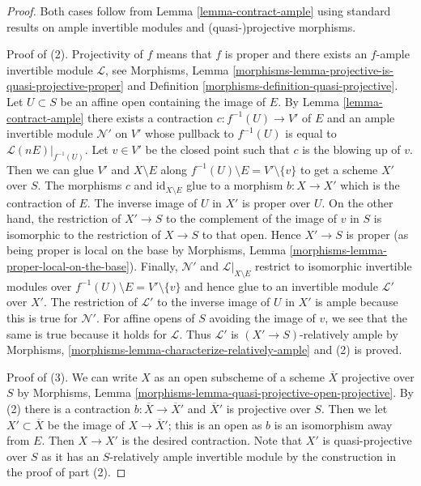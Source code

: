 \begin{proof}
Both cases follow from Lemma \ref{lemma-contract-ample}
using standard results on ample invertible modules and
(quasi-)projective morphisms.

\medskip\noindent
Proof of (2). Projectivity of $f$ means that $f$ is proper and there exists
an $f$-ample invertible module $\mathcal{L}$, see
Morphisms, Lemma \ref{morphisms-lemma-projective-is-quasi-projective-proper}
and Definition \ref{morphisms-definition-quasi-projective}.
Let $U \subset S$ be an affine open containing the image of $E$.
By Lemma \ref{lemma-contract-ample} there exists a contraction
$c : f^{-1}(U) \to V'$ of $E$ and an ample invertible module
$\mathcal{N}'$ on $V'$ whose pullback to $f^{-1}(U)$ is equal to
$\mathcal{L}(nE)|_{f^{-1}(U)}$. Let $v \in V'$ be the closed point
such that $c$ is the blowing up of $v$.
Then we can glue $V'$ and $X \setminus E$ along
$f^{-1}(U) \setminus E = V' \setminus \{v\}$
to get a scheme $X'$ over $S$. The morphisms $c$ and
$\text{id}_{X \setminus E}$ glue to a morphism $b : X \to X'$
which is the contraction of $E$. The inverse image of $U$ in $X'$
is proper over $U$. On the other hand, the restriction of $X' \to S$
to the complement of the image of $v$ in $S$ is isomorphic to the
restriction of $X \to S$ to that open. Hence $X' \to S$ is proper
(as being proper is local on the base by
Morphisms, Lemma \ref{morphisms-lemma-proper-local-on-the-base}).
Finally, $\mathcal{N}'$ and $\mathcal{L}|_{X \setminus E}$ restrict to
isomorphic invertible modules over $f^{-1}(U) \setminus E = V' \setminus \{v\}$
and hence glue to an invertible module $\mathcal{L}'$ over $X'$.
The restriction of $\mathcal{L}'$ to the inverse image of $U$
in $X'$ is ample because this is true for $\mathcal{N}'$.
For affine opens of $S$ avoiding the image of $v$, we see that
the same is true because it holds for $\mathcal{L}$.
Thus $\mathcal{L}'$ is $(X' \to S)$-relatively ample by
Morphisms, \ref{morphisms-lemma-characterize-relatively-ample}
and (2) is proved.

\medskip\noindent
Proof of (3). We can write $X$ as an open subscheme of a scheme
$\overline{X}$ projective over $S$ by Morphisms, Lemma
\ref{morphisms-lemma-quasi-projective-open-projective}.
By (2) there is a contraction $b : \overline{X} \to \overline{X}'$
and $\overline{X}'$ is projective over $S$. Then we let
$X' \subset \overline{X}$ be the image of $X \to \overline{X}'$;
this is an open as $b$ is an isomorphism away from $E$.
Then $X \to X'$ is the desired contraction. Note that
$X'$ is quasi-projective over $S$ as it has an
$S$-relatively ample invertible module
by the construction in the proof of part (2).
\end{proof}

